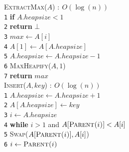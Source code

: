 \documentclass[10pt,landscape]{article}
\begin{document}
\begin{multicols*}{4}
                \setlength{\columnsep}{-0.6cm}
                \begin{multicols}{2}
                        \textsc{ExtractMax($A$)} $:\ O(\log(n))$                                     \\ [3pt]
                        \texttt{1}\hspace*{0.5em} \textbf{if} $A.heapsize < 1$                    \\
                        \texttt{2}\hspace*{1.5em} \textbf{return} $\bot$                    \\
                        \texttt{3}\hspace*{0.5em} $max \leftarrow A[i]$       \\
                        \texttt{4}\hspace*{0.5em} $A[1] \leftarrow A[A.heapsize]$      \\
                        \texttt{5}\hspace*{0.5em} $A.heapsize \leftarrow A.heapsize-1$      \\
                        \texttt{6}\hspace*{0.5em} \textsc{MaxHeapify}($A,1$)      \\
                        \texttt{7}\hspace*{0.5em} \textbf{return} $max$      \\
                        \columnbreak
                        \textsc{Insert($A,key$)} $:\ O(\log(n))$                                     \\ [3pt]
                        \texttt{1}\hspace*{0.5em} $A.heapsize \leftarrow A.heapsize+1$                    \\
                        \texttt{2}\hspace*{0.5em} $A[A.heapsize] \leftarrow key$                    \\
                        \texttt{3}\hspace*{0.5em} $i \leftarrow A.heapsize$       \\
                        \texttt{4}\hspace*{0.5em} \textbf{while} $i > 1$ and $A[\textsc{Parent($i$)}] < A[i]$      \\
                        \texttt{5}\hspace*{1.5em} \textsc{Swap}($A[\textsc{Parent($i$)}],A[i]$)     \\
                        \texttt{6}\hspace*{1.5em} $i \leftarrow \textsc{Parent($i$)}$       \\
                \end{multicols}

\end{multicols*}
\end{document}
